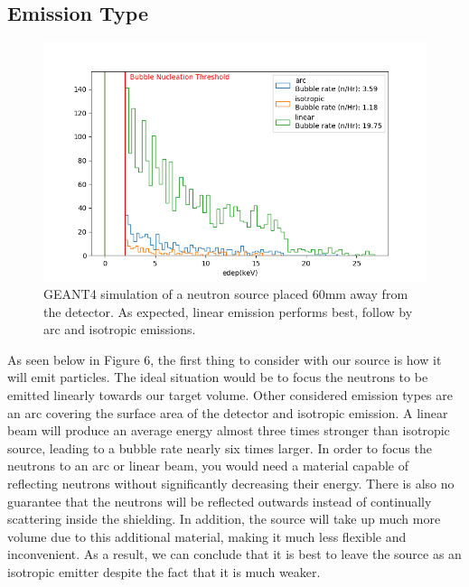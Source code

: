 \documentclass[%
12pt,
twoside,
reprint,
amsmath,amssymb,
aps,
]{article}
\begin{document}
	\subsection{Emission Type}
	\begin{figure}[!b]
		\includegraphics[scale = 0.6, center]{Images/emission.png}
		\caption{\label{tab:table-name} GEANT4 simulation of a neutron source placed 60mm away from the detector. As expected, linear emission performs best, follow by arc and isotropic emissions.}
	\end{figure}
	\par As seen below in Figure 6, the first thing to consider with our source is how it will emit particles. The ideal situation would be to focus the neutrons to be emitted linearly towards our target volume. Other considered emission types are an arc covering the surface area of the detector and isotropic emission. A linear beam will produce an average energy almost three times stronger than isotropic source, leading to a bubble rate nearly six times larger. In order to focus the neutrons to an arc or linear beam, you would need a material capable of reflecting neutrons without significantly decreasing their energy. There is also no guarantee that the neutrons will be reflected outwards instead of continually scattering inside the shielding. In addition, the source will take up much more volume due to this additional material, making it much less flexible and inconvenient. As a result, we can conclude that it is best to leave the source as an isotropic emitter despite the fact that it is much weaker.
\end{document}
